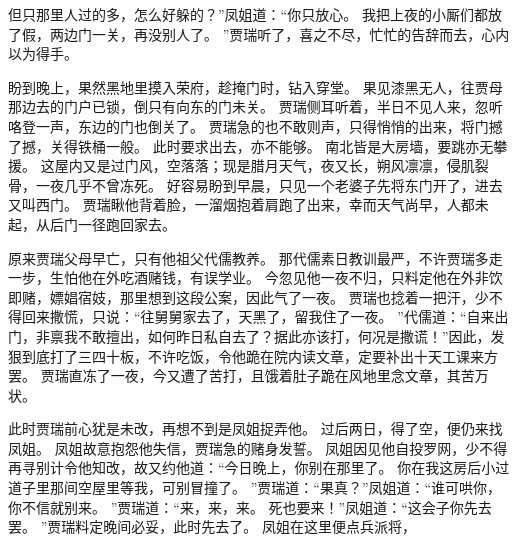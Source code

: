 但只那里人过的多，怎么好躲的？”凤姐道：“你只放心。
我把上夜的小厮们都放了假，两边门一关，再没别人了。
”贾瑞听了，喜之不尽，忙忙的告辞而去，心内以为得手。
\par
盼到晚上，果然黑地里摸入荣府，趁掩门时，钻入穿堂。
果见漆黑无人，往贾母那边去的门户已锁，倒只有向东的门未关。
贾瑞侧耳听着，半日不见人来，忽听咯登一声，东边的门也倒关了。
贾瑞急的也不敢则声，只得悄悄的出来，将门撼了撼，关得铁桶一般。
此时要求出去，亦不能够。
南北皆是大房墙，要跳亦无攀援。
这屋内又是过门风，空落落；现是腊月天气，夜又长，朔风凛凛，侵肌裂骨，一夜几乎不曾冻死。
好容易盼到早晨，只见一个老婆子先将东门开了，进去又叫西门。
贾瑞瞅他背着脸，一溜烟抱着肩跑了出来，幸而天气尚早，人都未起，从后门一径跑回家去。
\par
原来贾瑞父母早亡，只有他祖父代儒教养。
那代儒素日教训最严，不许贾瑞多走一步，生怕他在外吃酒赌钱，有误学业。
今忽见他一夜不归，只料定他在外非饮即赌，嫖娼宿妓，那里想到这段公案，因此气了一夜。
贾瑞也捻着一把汗，少不得回来撒慌，只说：“往舅舅家去了，天黑了，留我住了一夜。
”代儒道：“自来出门，非禀我不敢擅出，如何昨日私自去了？据此亦该打，何况是撒谎！”因此，发狠到底打了三四十板，不许吃饭，令他跪在院内读文章，定要补出十天工课来方罢。
贾瑞直冻了一夜，今又遭了苦打，且饿着肚子跪在风地里念文章，其苦万状。
\par
此时贾瑞前心犹是未改，再想不到是凤姐捉弄他。
过后两日，得了空，便仍来找凤姐。
凤姐故意抱怨他失信，贾瑞急的赌身发誓。
凤姐因见他自投罗网，少不得再寻别计令他知改，故又约他道：“今日晚上，你别在那里了。
你在我这房后小过道子里那间空屋里等我，可别冒撞了。
”贾瑞道：“果真？”凤姐道：“谁可哄你，你不信就别来。
”贾瑞道：“来，来，来。
死也要来！”凤姐道：“这会子你先去罢。
”贾瑞料定晚间必妥，此时先去了。
凤姐在这里便点兵派将，
